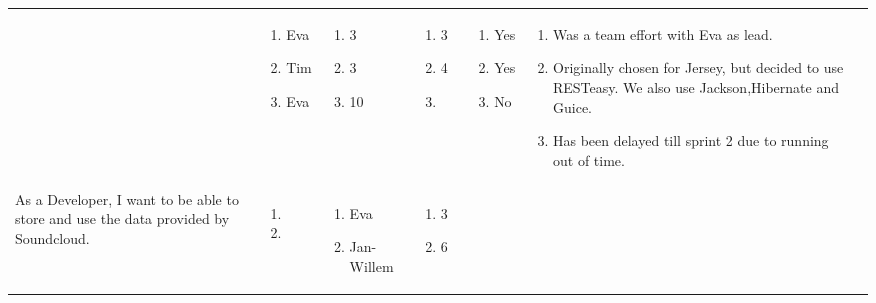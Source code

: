 \documentclass[11pt,a4paper,landscape]{article}
\begin{document}
\begin{table}[h]
\begin{tabular}{|p{5cm}|p{1.0cm}|p{2.5cm}|p{1.8cm}|p{1.8cm}|p{1.0cm}|p{12cm}}
& 
\begin{enumerate}[leftmargin=0.1cm,itemindent=0.1cm]
\item[] Eva 
\item[] Tim
\item[] Eva 
\end{enumerate}

& 
\begin{enumerate}[leftmargin=0.1cm,itemindent=0.1cm]
\item[] 3 
\item[] 3 
\item[] 10 
\end{enumerate}

&
\begin{enumerate}[leftmargin=0.1cm,itemindent=0.1cm]
\item[] 3 
\item[] 4 
\item[]
\end{enumerate}

&
\begin{enumerate}[leftmargin=0.1cm,itemindent=0.1cm]
\item[] Yes
\item[] Yes
\item[] No
\end{enumerate}

&
\begin{enumerate}[leftmargin=0.5cm,itemindent=0.1cm]
\item Was a team effort with Eva as lead.
\item Originally chosen for Jersey, but decided to use RESTeasy. We also use Jackson,Hibernate and Guice.
\item Has been delayed till sprint 2 due to running out of time.
\end{enumerate}
\\
As a Developer, I want to be able to store and use the data provided by Soundcloud. & \begin{enumerate}[leftmargin=0.3cm,itemindent=0.1cm]
\item 
\item
\end{enumerate}

& 
\begin{enumerate}[leftmargin=0.1cm,itemindent=0.1cm]
\item[] Eva 
\item[] Jan-Willem 
\end{enumerate}

& 
\begin{enumerate}[leftmargin=0.1cm,itemindent=0.1cm]
\item[] 3 
\item[] 6 
\end{enumerate}


\end{tabular}
\end{table}
\end{document}
